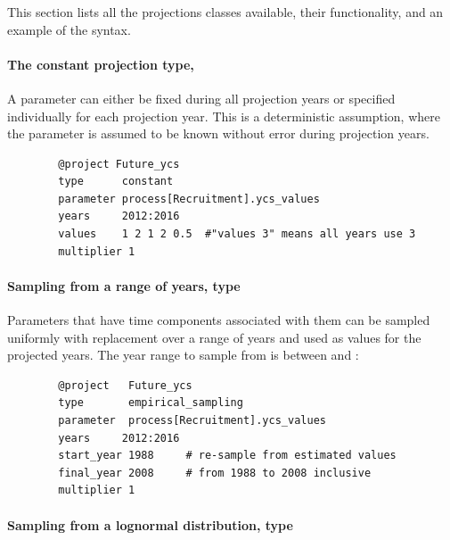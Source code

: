 \subsubsection{\label{sec:ProjectionMethods}}

This section lists all the projections classes available, their functionality, and an example of the syntax.

\paragraph[Constant]{The constant projection type, }\label{sec:Project-Constant}

A parameter can either be fixed during all projection years or specified individually for each projection year. This is a deterministic assumption, where the parameter is assumed to be known without error during projection years.

{\small{\begin{verbatim}
		@project Future_ycs
		type      constant
		parameter process[Recruitment].ycs_values
		years     2012:2016
		values    1 2 1 2 0.5  #"values 3" means all years use 3
		multiplier 1
		\end{verbatim}}}

\paragraph[Empirical sampling]{Sampling from a range of years, type  }\label{sec:Project-EmpiricalSampling}

Parameters that have time components associated with them can be sampled uniformly with replacement over a range of years and used as values for the projected years. The year range to sample from is between  and :

{\small{\begin{verbatim}
		@project   Future_ycs
		type       empirical_sampling
		parameter  process[Recruitment].ycs_values
		years     2012:2016
		start_year 1988     # re-sample from estimated values
		final_year 2008     # from 1988 to 2008 inclusive
		multiplier 1
		\end{verbatim}}}


\paragraph[Lognormal]{Sampling from a lognormal distribution, type  }\label{sec:Project-LogNormal} 


